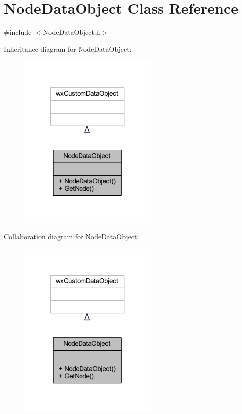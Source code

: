 \hypertarget{class_node_data_object}{}\section{Node\+Data\+Object Class Reference}
\label{class_node_data_object}


{\ttfamily \#include $<$Node\+Data\+Object.\+h$>$}



Inheritance diagram for Node\+Data\+Object\+:\nopagebreak
\begin{figure}[H]
\begin{center}
\leavevmode
\includegraphics[width=191pt]{class_node_data_object__inherit__graph}
\end{center}
\end{figure}


Collaboration diagram for Node\+Data\+Object\+:\nopagebreak
\begin{figure}[H]
\begin{center}
\leavevmode
\includegraphics[width=191pt]{class_node_data_object__coll__graph}
\end{center}
\end{figure}
